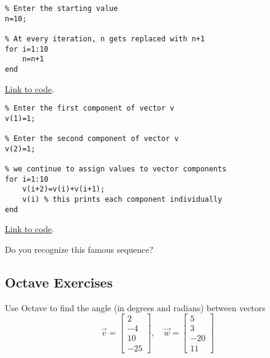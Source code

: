 \documentclass{ximera}
\begin{document}
\begin{example}\label{ex:loop1}
        \begin{verbatim}
% Enter the starting value
n=10;

% At every iteration, n gets replaced with n+1
for i=1:10
    n=n+1
end
    \end{verbatim}

\href{https://sagecell.sagemath.org/?z=eJwdyjEOglAQRdF-ktnDa6iw4LeSX1i4kB95wiRkMMOIcfcSb3lyO9w9GciF2LNFms842vqmitcyjCoqHW4JHowv7Jxb2uYXOGbmjuBrbQ9O-Fgu8L6oPLeA1XItgwrOvP6ZPv0AoF8hKw==&lang=octave&interacts=eJyLjgUAARUAuQ==}{Link to code}.    
\end{example}

\begin{example}\label{ex:loop2}
    \begin{verbatim}
% Enter the first component of vector v
v(1)=1;

% Enter the second component of vector v
v(2)=1;

% we continue to assign values to vector components
for i=1:10
    v(i+2)=v(i)+v(i+1);
    v(i) % this prints each component individually
end
    \end{verbatim}

\href{https://sagecell.sagemath.org/?z=eJx1jjEKwzAMRXeD76AlEJOl7tiQsQcxttwIUjnYiktvXwdKmqVapC_pfX4HdxbMIDNCpFwEfHquiZEFUoSKXlKGqlXtrZnsqJVW3Ykp6BOH_9D1B72wvbEQbwiSwJVCD4bqlg3Lvvhih1XRKjZNk73Zi1bQqvY0NMfWzLDP1ozHwUDXElGBNVODAZ2fT7mIA1UKm1uWt1bI4QOvKk6t&lang=octave&interacts=eJyLjgUAARUAuQ==}{Link to code}.   

Do you recognize this famous sequence?
\end{example}

\subsection*{Octave Exercises}

\begin{problem}\label{prob_oct_vec_2}
    Use Octave to find the angle (in degrees and radians) between vectors 
    $$\vec{v}=\begin{bmatrix}2\\-4\\10\\-25\end{bmatrix},\quad\vec{w}=\begin{bmatrix}5\\3\\-20\\11\end{bmatrix}$$
\end{problem}
\end{document}
